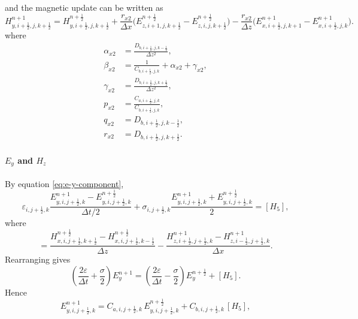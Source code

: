 \documentclass{article}
\numberwithin{equation}{section}
\numberwithin{figure}{section}
\begin{document}
and the magnetic update can be written as
\begin{equation}
    H_{y,i+\tfrac12,j,k+\tfrac12}^{n+1} = H_{y,i+\tfrac12,j,k+\tfrac12}^{n+\frac12} + \frac{r_{x2}}{\Delta x}\Big(E_{z,i+1,j,k+\tfrac12}^{n+\frac12}-E_{z,i,j,k+\tfrac12}^{n+\frac12}\Big) - \frac{r_{x2}}{\Delta z}\Big(E_{x,i+\tfrac12,j,k+1}^{n+1}-E_{x,i+\tfrac12,j,k}^{n+1}\Big).
    \label{eq:adi-second-hy}
\end{equation}
where
\begin{align}
    \alpha_{x2} & =\frac{D_{b,i+\tfrac12,j,k-\tfrac12}}{\Delta z^2},       \\
    \beta_{x2}  & =\frac{1}{C_{b,i+\tfrac12,j,k}}+\alpha_{x2}+\gamma_{x2}, \\
    \gamma_{x2} & =\frac{D_{b,i+\tfrac12,j,k+\tfrac12}}{\Delta z^2},       \\
    p_{x2}      & =\frac{C_{a,i+\tfrac12,j,k}}{C_{b,i+\tfrac12,j,k}},      \\
    q_{x2}      & =D_{b,i+\tfrac12,j,k-\tfrac12},                          \\
    r_{x2}      & =D_{b,i+\tfrac12,j,k+\tfrac12}.
\end{align}



\paragraph{$E_y$ and $H_z$}
By equation \eqref{eq:e-y-component},
\begin{equation}
    \varepsilon_{i,j+\tfrac12,k} \frac{E_{y,i,j+\tfrac12,k}^{n+1}-E_{y,i,j+\tfrac12,k}^{n+\frac12}}{\Delta t/2} + \sigma_{i,j+\tfrac12,k} \frac{E_{y,i,j+\tfrac12,k}^{n+1}+E_{y,i,j+\tfrac12,k}^{n+\frac12}}{2} = [H_5],
    \label{eq:second-e-ey}
\end{equation}
where
\begin{equation}
    [H_5] = \frac{H_{x,i,j+\tfrac12,k+\tfrac12}^{n+\frac12}-H_{x,i,j+\tfrac12,k-\tfrac12}^{n+\frac12}}{\Delta z} - \frac{H_{z,i+\tfrac12,j+\tfrac12,k}^{n+1}-H_{z,i-\tfrac12,j+\tfrac12,k}^{n+1}}{\Delta x}.
\end{equation}
Rearranging gives
\begin{equation}
    \left(\frac{2\varepsilon}{\Delta t}+\frac{\sigma}{2}\right) E_{y}^{n+1} = \left(\frac{2\varepsilon}{\Delta t}-\frac{\sigma}{2}\right) E_{y}^{n+\frac12} + [H_5].
\end{equation}
Hence
\begin{equation}
    E_{y,i,j+\tfrac12,k}^{n+1} = C_{a,i,j+\tfrac12,k}\,E_{y,i,j+\tfrac12,k}^{n+\frac12} + C_{b,i,j+\tfrac12,k}\,[H_5],
    \label{eq:second-e-ey-adi}
\end{equation}
\end{document}
